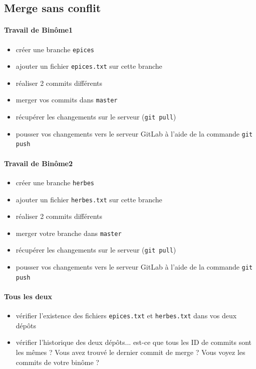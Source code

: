 \documentclass[final, a4paper, openbib, ]{article}
\begin{document}
\subsection{Merge sans conflit}

\paragraph{Travail de Binôme1}
\begin{itemize}
\item créer une branche \texttt{epices}
\item ajouter un fichier \texttt{epices.txt} sur cette branche
\item réaliser 2 commits différents
\item merger vos commits dans \texttt{master}
\item récupérer les changements sur le serveur (\texttt{git pull})
\item pousser vos changements vers le serveur GitLab à l'aide de la commande \texttt{git push}
\end{itemize}

\paragraph{Travail de Binôme2}
\begin{itemize}
\item créer une branche \texttt{herbes}
\item ajouter un fichier \texttt{herbes.txt} sur cette branche
\item réaliser 2 commits différents
\item merger votre branche dans \texttt{master}
\item récupérer les changements sur le serveur (\texttt{git pull})
\item pousser vos changements vers le serveur GitLab à l'aide de la commande \texttt{git push}\\
\end{itemize}

\paragraph{Tous les deux}
\begin{itemize}
\item vérifier l'existence des fichiers \texttt{epices.txt} et \texttt{herbes.txt} dans vos deux dépôts
\item vérifier l'historique des deux dépôts... est-ce que tous les ID de commits sont les mêmes ? Vous avez trouvé le dernier commit de merge ? Vous voyez les commits de votre binôme ?\\
\end{itemize}
\end{document}
